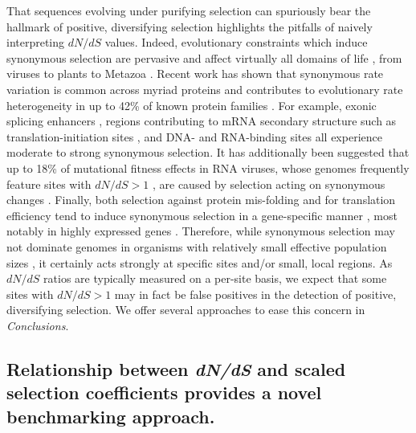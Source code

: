 \documentclass[11pt]{article}
\begin{document}
That sequences evolving under purifying selection can spuriously bear the hallmark of positive, diversifying selection highlights the pitfalls of naively interpreting $dN/dS$ values. Indeed, evolutionary constraints which induce synonymous selection are pervasive and affect virtually all domains of life \citep{GuZhouWilke2010}, from viruses \citep{Cuevasetal2011,ZaniniNeher2013} to plants \citep{Guetal2012} to Metazoa \citep{Duret2002,Chamaryetal2006,HershbergPetrov2008,PlotkinKudla2010,Lawrieetal2013}. 
Recent work has shown that synonymous rate variation is common across myriad proteins and contributes to evolutionary rate heterogeneity in up to 42\% of known protein families \citep{Dimitrieva2014}. For example, exonic splicing enhancers \citep{Schattner2006,Parmleyetal2006,ParmleyHurst2007}, regions contributing to mRNA secondary structure such as translation-initiation sites \citep{Chamaryetal2005,Schattner2006,GuZhouWilke2010,Cuevasetal2011,ZaniniNeher2013}, and DNA- and RNA-binding sites \citep{Parmleyetal2006} all experience moderate to strong synonymous selection. It has additionally been suggested that up to 18\% of mutational fitness effects in RNA viruses, whose genomes frequently feature sites with $dN/dS > 1$ \citep{Bushetal1999,Suzuki2006,Bhattetal2011,Meyeretal2013,MeyerWilke2013}, are caused by selection acting on synonymous changes \citep{Cuevasetal2011}. Finally, both selection against protein mis-folding and for translation efficiency tend to induce synonymous selection in a gene-specific manner \citep{WillifordDemuth2012,Agasheetal2013}, most notably in highly expressed genes \citep{DrummondWilke2008,Lawrieetal2013}. Therefore, while synonymous selection may not dominate genomes in organisms with relatively small effective population sizes \citep{Chamaryetal2006, PlotkinKudla2010}, it certainly acts strongly at specific sites and/or small, local regions. As $dN/dS$ ratios are typically measured on a per-site basis, we expect that some sites with $dN/dS > 1$ may in fact be false positives in the detection of positive, diversifying selection. We offer several approaches to ease this concern in \emph{Conclusions}.



\subsection*{Relationship between \emph{dN/dS} and scaled selection coefficients provides a novel benchmarking approach.}
\end{document}

